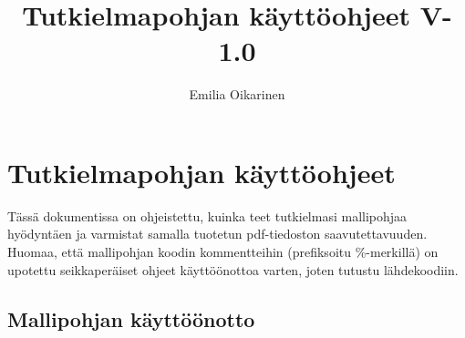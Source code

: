 \documentclass[finnish, manual, a4paper]{csthesis}
\begin{document}
\title{Tutkielmapohjan käyttöohjeet V-1.0}
\author{Emilia Oikarinen}
\thispagestyle{empty}
\maketitle


\cleardoublepage
{}
\tableofcontents
\cleardoublepage
{}

\chapter{Tutkielmapohjan käyttöohjeet}
\label{appendix:instructions_finnish}

Tässä dokumentissa on ohjeistettu, kuinka teet tutkielmasi mallipohjaa hyödyntäen ja varmistat samalla tuotetun pdf-tiedoston saavutettavuuden. Huomaa, että mallipohjan koodin kommentteihin (prefiksoitu \%-merkillä) on upotettu seikkaperäiset ohjeet käyttöönottoa varten, joten tutustu lähdekoodiin.

\section{Mallipohjan käyttöönotto}
\end{document}
